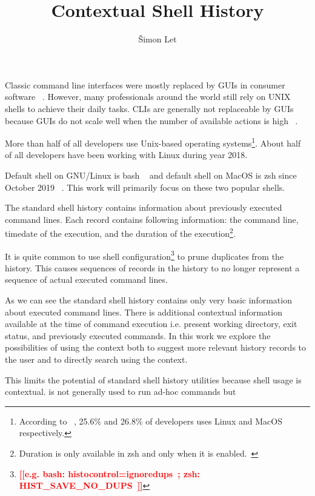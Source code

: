 \documentclass[thesis=M,english]{FITthesis}[2012/10/20]
\title{Contextual Shell History}
\author{Šimon Let} %
\newcommand{\todotext}[1]{\textcolor{red}{\textbf{[[#1]]}}}
\let\myCite\cite
\renewcommand\cite{\unskip~\myCite}
\begin{document}
\begin{introduction}

Classic command line interfaces were mostly replaced by GUIs in consumer software \cite{norman2007ui}.  However, many professionals around the world still rely on UNIX shells to achieve their daily tasks. CLIs are generally not replaceable by GUIs because GUIs do not scale well when the number of available actions is high \cite{norman2007ui}. 

More than half of all developers use Unix-based operating systems\footnote{According to \cite{stackoverflow2019devsurvey}, 25.6\% and 26.8\% of developers uses Linux and MacOS respectively.}. 
About half of all developers have been working with Linux during year 2018. \cite{stackoverflow2019devsurvey} 

Default shell on GNU/Linux is bash \cite{ramey1994gnubash} and default shell on MacOS is zsh since October 2019 \cite{apple2019zsh}. This work will primarily focus on these two popular shells.

The standard shell history contains information about previously executed command lines. Each record contains following information: the command line, timedate of the execution, and the duration of the execution\footnote{Duration is only available in zsh and only when it is enabled.\cite{zshdocs}}.

It is quite common to use shell configuration\footnote{\todotext{e.g. bash: histocontrol=ignoredups\cite{bashman}; zsh: HIST\_SAVE\_NO\_DUPS\cite{zshdocs}}} to prune duplicates from the history. This causes sequences of records in the history to no longer represent a sequence of actual executed command lines. 

As we can see the standard shell history contains only very basic information about executed command lines.
There is additional contextual information available at the time of command execution i.e. present working directory, exit status, and previously executed commands. In this work we explore the possibilities of using the context both to suggest more relevant history records to the user and to directly search using the context.


This limits the potential of standard shell history utilities because shell usage is contextual. is not generally used to run ad-hoc commands but 




\end{introduction}
\end{document}
